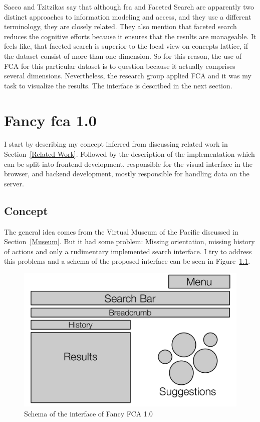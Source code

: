 \documentclass[11pt]{report}
\begin{document}
Sacco and Tzitzikas \cite{Sacco2009} say that although \acrshort{fca} and Faceted Search are apparently two distinct approaches to information modeling and access, and they use a different terminology, they are closely related. They also mention that faceted search reduces the cognitive efforts because it ensures that the results are manageable. It feels like, that faceted search is superior to the local view on concepts lattice, if the dataset consist of more than one dimension. So for this reason, the use of FCA for this particular dataset is to question because it actually comprises several dimensions. Nevertheless, the research group applied FCA and it was my task to visualize the results. The interface is described in the next section.

\chapter{Fancy \acrshort{fca} 1.0}
\label{Fancy 1.0}

I start by describing my concept inferred from discussing related work in Section~\ref{Related Work}. Followed by the description of the implementation which can be split into frontend development, responsible for the visual interface in the browser, and backend development, mostly responsible for handling data on the server.

\section{Concept}

The general idea comes from the Virtual Museum of the Pacific discussed in Section~\ref{Museum}. But it had some problem: Missing orientation, missing history of actions and only a rudimentary implemented search interface. I try to address this problems and a schema of the proposed interface can be seen in Figure~\ref{figure:schema}.

\begin{figure}[!ht]
	\centering
	\includegraphics[width=\linewidth]{images/schema}
\caption{Schema of the interface of Fancy FCA 1.0}
\label{figure:schema}
\end{figure}
\end{document}
